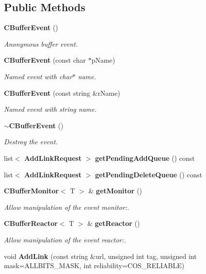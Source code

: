 \subsection*{Public Methods}
\begin{CompactItemize}
\item 
{\bf CBuffer\-Event} ()
\begin{CompactList}\small\item\em Anonymous buffer event.\item\end{CompactList}\item 
{\bf CBuffer\-Event} (const char $\ast$p\-Name)
\begin{CompactList}\small\item\em Named event with char$\ast$ name.\item\end{CompactList}\item 
{\bf CBuffer\-Event} (const string \&r\-Name)
\begin{CompactList}\small\item\em Named event with string name.\item\end{CompactList}\item 
{\bf $\sim$CBuffer\-Event} ()
\begin{CompactList}\small\item\em Destroy the event.\item\end{CompactList}\item 
list$<$ {\bf Add\-Link\-Request} $>$ {\bf get\-Pending\-Add\-Queue} () const
\item 
list$<$ {\bf Add\-Link\-Request} $>$ {\bf get\-Pending\-Delete\-Queue} () const
\item 
{\bf CBuffer\-Monitor}$<$ T $>$ \& {\bf get\-Monitor} ()
\begin{CompactList}\small\item\em Allow manipulation of the event monitor:.\item\end{CompactList}\item 
{\bf CBuffer\-Reactor}$<$ T $>$ \& {\bf get\-Reactor} ()
\begin{CompactList}\small\item\em Allow manipulation of the event reactor:.\item\end{CompactList}\item 
void {\bf Add\-Link} (const string \&url, unsigned int tag, unsigned int mask=ALLBITS\_\-MASK, int reliability=COS\_\-RELIABLE)

\end{CompactItemize}

